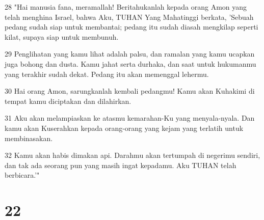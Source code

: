 \par 28 "Hai manusia fana, meramallah! Beritahukanlah kepada orang Amon yang telah menghina Israel, bahwa Aku, TUHAN Yang Mahatinggi berkata, 'Sebuah pedang sudah siap untuk membantai; pedang itu sudah diasah mengkilap seperti kilat, supaya siap untuk membunuh.
\par 29 Penglihatan yang kamu lihat adalah palsu, dan ramalan yang kamu ucapkan juga bohong dan dusta. Kamu jahat serta durhaka, dan saat untuk hukumanmu yang terakhir sudah dekat. Pedang itu akan memenggal lehermu.
\par 30 Hai orang Amon, sarungkanlah kembali pedangmu! Kamu akan Kuhakimi di tempat kamu diciptakan dan dilahirkan.
\par 31 Aku akan melampiaskan ke atasmu kemarahan-Ku yang menyala-nyala. Dan kamu akan Kuserahkan kepada orang-orang yang kejam yang terlatih untuk membinasakan.
\par 32 Kamu akan habis dimakan api. Darahmu akan tertumpah di negerimu sendiri, dan tak ada seorang pun yang masih ingat kepadamu. Aku TUHAN telah berbicara.'"

\chapter{22}

